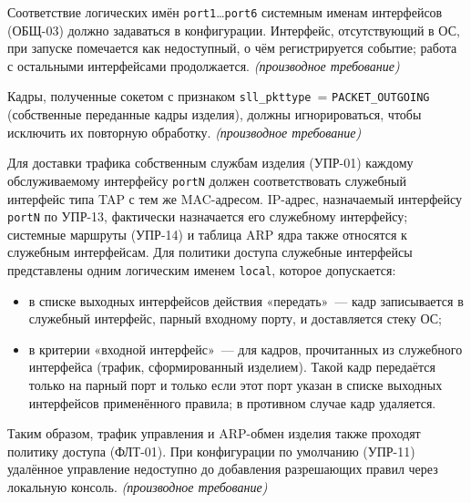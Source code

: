 \documentclass[12pt,a4paper,final]{article}
\newenvironment{reqs}
  {\begin{description}[style=sameline,leftmargin=2.2cm,labelwidth=2.0cm,
     labelsep=0.2cm,font=\normalfont\bfseries,itemsep=3pt]}
  {\end{description}}
\newcommand{\der}{\textit{(производное требование)}}
\begin{document}
\begin{reqs}
\item[ОБР-03] Соответствие логических имён \texttt{port1}\ldots\texttt{port6}
  системным именам интерфейсов (ОБЩ-03) должно задаваться в конфигурации.
  Интерфейс, отсутствующий в ОС, при запуске помечается как недоступный,
  о чём регистрируется событие; работа с остальными интерфейсами
  продолжается. \der

\item[ОБР-04] Кадры, полученные сокетом с признаком
  \texttt{sll\_pkttype}~=\allowbreak{} \texttt{PACKET\_OUTGOING} (собственные переданные кадры
  изделия), должны игнорироваться, чтобы исключить их повторную обработку. \der

\item[ОБР-05] Для доставки трафика собственным службам изделия (УПР-01) каждому
  обслуживаемому интерфейсу \texttt{portN} должен соответствовать служебный
  интерфейс типа TAP с тем же MAC-адресом. IP-адрес, назначаемый
  интерфейсу \texttt{portN} по УПР-13, фактически назначается его служебному
  интерфейсу; системные маршруты (УПР-14) и таблица ARP ядра также относятся
  к служебным интерфейсам. Для политики доступа служебные интерфейсы
  представлены одним логическим именем \texttt{local}, которое допускается:
  \begin{itemize}
  \item в списке выходных интерфейсов действия «передать»~— кадр записывается
    в служебный интерфейс, парный входному порту, и доставляется стеку ОС;
  \item в критерии «входной интерфейс»~— для кадров, прочитанных из служебного
    интерфейса (трафик, сформированный изделием). Такой кадр передаётся только
    на парный порт и только если этот порт указан в списке выходных интерфейсов
    применённого правила; в противном случае кадр удаляется.
  \end{itemize}
  Таким образом, трафик управления и ARP-обмен изделия также проходят политику
  доступа (ФЛТ-01). При конфигурации по умолчанию (УПР-11) удалённое
  управление недоступно до добавления разрешающих правил через локальную
  консоль. \der


\end{reqs}
\end{document}
